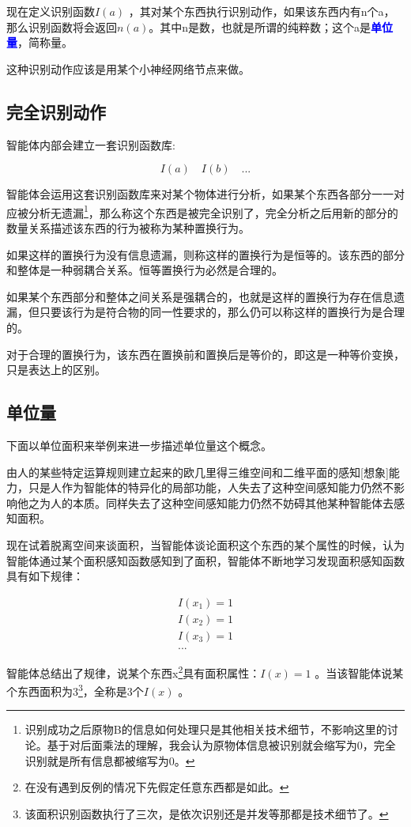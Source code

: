 \documentclass[12pt,oneside]{book}
\renewcommand{\emph}[1]{\textcolor{blue}{\textbf{#1}}}
\begin{document}
现在定义识别函数$I(a)$ ，其对某个东西执行识别动作，如果该东西内有n个a，那么识别函数将会返回$n(a)$。其中n是数，也就是所谓的纯粹数；这个a是\emph{单位量}，简称量。

这种识别动作应该是用某个小神经网络节点来做。

\subsection{完全识别动作}
智能体内部会建立一套识别函数库: 

\[
I(a) \quad I(b) \quad ...
\]

智能体会运用这套识别函数库来对某个物体进行分析，如果某个东西各部分一一对应被分析无遗漏\footnote{识别成功之后原物B的信息如何处理只是其他相关技术细节，不影响这里的讨论。基于对后面乘法的理解，我会认为原物体信息被识别就会缩写为0，完全识别就是所有信息都被缩写为0。}，那么称这个东西是被完全识别了，完全分析之后用新的部分的数量关系描述该东西的行为被称为某种置换行为。

如果这样的置换行为没有信息遗漏，则称这样的置换行为是恒等的。该东西的部分和整体是一种弱耦合关系。恒等置换行为必然是合理的。

如果某个东西部分和整体之间关系是强耦合的，也就是这样的置换行为存在信息遗漏，但只要该行为是符合物的同一性要求的，那么仍可以称这样的置换行为是合理的。

对于合理的置换行为，该东西在置换前和置换后是等价的，即这是一种等价变换，只是表达上的区别。

\subsection{单位量}
下面以单位面积来举例来进一步描述单位量这个概念。

由人的某些特定运算规则建立起来的欧几里得三维空间和二维平面的感知[想象]能力，只是人作为智能体的特异化的局部功能，人失去了这种空间感知能力仍然不影响他之为人的本质。同样失去了这种空间感知能力仍然不妨碍其他某种智能体去感知面积。

现在试着脱离空间来谈面积，当智能体谈论面积这个东西的某个属性的时候，认为智能体通过某个面积感知函数感知到了面积，智能体不断地学习发现面积感知函数具有如下规律：

\begin{align*}
I(x_1)=1\\
I(x_2)=1\\
I(x_3)=1\\
...
\end{align*}

智能体总结出了规律，说某个东西x\footnote{在没有遇到反例的情况下先假定任意东西都是如此。}具有面积属性：$I(x)=1$ 。当该智能体说某个东西面积为3\footnote{该面积识别函数执行了三次，是依次识别还是并发等那都是技术细节了。}，全称是3个$I(x)$ 。
\end{document}
